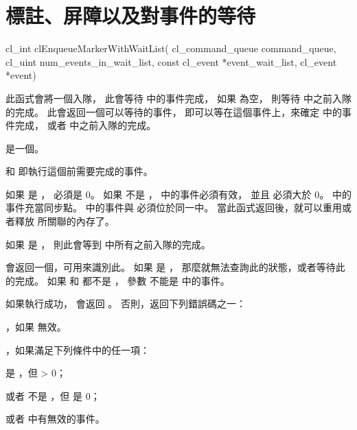 \section{標註、屏障以及對事件的等待}


\startCLFUNC
cl_int clEnqueueMarkerWithWaitList(
			cl_command_queue command_queue,
			cl_uint num_events_in_wait_list,
			const cl_event *event_wait_list,
			cl_event *event)
\stopCLFUNC

此函式會將一個入隊，
此會等待  中的事件完成，
如果  為空，
則等待  中之前入隊的完成。
此會返回一個可以等待的事件，
即可以等在這個事件上，來確定  中的事件完成，
或者  中之前入隊的完成。

 是一個。

 和 
 即執行這個前需要完成的事件。

如果  是 ，
 必須是 0。
如果  不是 ，
 中的事件必須有效，
並且  必須大於 0。
 中的事件充當同步點。
 中的事件與  必須位於同一中。
當此函式返回後，就可以重用或者釋放  所關聯的內存了。

如果  是 ，
則此會等到  中所有之前入隊的完成。

 會返回一個，可用來識別此。
如果  是 ，
那麼就無法查詢此的狀態，或者等待此的完成。
如果  和  都不是 ，
參數  不能是  中的事件。

如果執行成功，  會返回 。
否則，返回下列錯誤碼之一：
\startigBase
\item {}，如果  無效。

\startitem
{}，如果滿足下列條件中的任一項：
\startigBase
\item {} 是 ，但  > 0；
\item 或者  不是 ，但  是 0；
\item 或者  中有無效的事件。
\stopigBase
\stopitem

